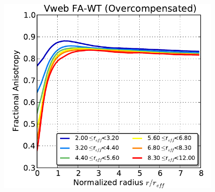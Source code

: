 \documentclass[a4,useAMS,usenatbib,usegraphicx]{latex/mn2e}
\begin{document}
\begin{flushleft}
\begin{figure}
  \includegraphics[trim = 1mm 0mm 5mm 0mm, clip, keepaspectratio=true,
  width=0.24\textheight]{./figures/voids_FA_VwebFAG1.pdf}  
  


  \label{fig:RhoVel}
  \vspace{0.1 cm}

\end{figure}
\end{flushleft}
\end{document}
